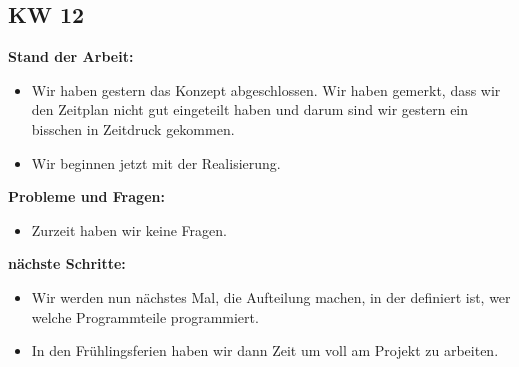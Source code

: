 \documentclass[10pt,paper=a4,final]{scrartcl}
\begin{document}
\subsection{KW 12}
\begin{description}
  \item {\bf Stand der Arbeit: } \\
    \begin{itemize}
      \item Wir haben gestern das Konzept abgeschlossen. Wir haben gemerkt, dass wir den Zeitplan nicht gut eingeteilt haben und darum sind wir gestern ein bisschen in Zeitdruck gekommen.
      \item Wir beginnen jetzt mit der Realisierung.
    \end{itemize}
  \item {\bf Probleme und Fragen: } \\
    \begin{itemize}
      \item Zurzeit haben wir keine Fragen.
    \end{itemize}
  \item {\bf nächste Schritte: } \\
    \begin{itemize}
      \item Wir werden nun nächstes Mal, die Aufteilung machen, in der definiert ist, wer welche Programmteile programmiert.
      \item In den Frühlingsferien haben wir dann Zeit um voll am Projekt zu arbeiten.
    \end{itemize}
\end{description}
\end{document}
